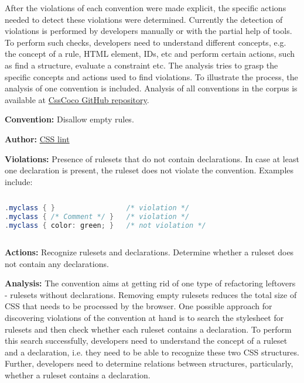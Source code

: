 \documentclass[parskip=full]{uvamscse}
\begin{document}
After the violations of each convention were made explicit, the specific actions needed to detect
these violations were determined. Currently the detection of violations is performed by developers
manually or with the partial help of tools. To perform such checks, developers need to understand
different concepts, e.g. the concept of a rule, HTML element, IDs, etc and perform certain actions,
such as find a structure, evaluate a constraint etc. The analysis tries to grasp the specific
concepts and actions used to find violations. To illustrate the process, the analysis of one convention is included. Analysis of all conventions in the corpus is available at
\href{https://github.com/boryanagoncharenko/CssCoco/blob/master/analysis.md}{CssCoco GitHub
repository}.

\begin{description}
\item\textbf{Convention:} Disallow empty rules.
\item\textbf{Author:} \href{https://github.com/CSSLint/csslint/wiki/Disallow-empty-rules}{CSS lint}
\item\textbf{Violations:} Presence of rulesets that do not contain declarations. In case at least one declaration is present, the ruleset does not violate the convention. Examples include:
\begin{sourcecode}
\begin{lstlisting}[style=mono,language=Java]
.myclass { }                 /* violation */
.myclass { /* Comment */ }   /* violation */
.myclass { color: green; }   /* not violation */
\end{lstlisting}
\end{sourcecode}

\item\textbf{Actions:} Recognize rulesets and declarations. Determine whether a ruleset does not contain any declarations.

\item\textbf{Analysis:} The convention aims at getting rid of one type of refactoring leftovers -
rulesets without declarations. Removing empty rulesets reduces the total size of CSS that
needs to be processed by the browser. One possible approach for discovering violations of the
convention at hand is to search the stylesheet for rulesets and then check whether each ruleset
contains a declaration. To perform this search successfully, developers need to understand the
concept of a ruleset and a declaration, i.e. they need to be able to recognize these two CSS
structures. Further, developers need to determine relations between structures, particularly,
whether a ruleset contains a declaration.

\end{description}
\end{document}
